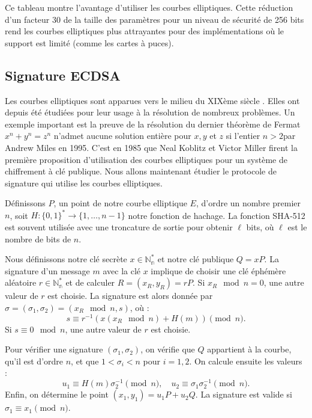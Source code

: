 \documentclass{backend}
\begin{document}
Ce tableau montre l'avantage d'utiliser les courbes elliptiques. Cette réduction d'un facteur 30 de la taille des paramètres pour un niveau de sécurité de 256 bits rend les courbes elliptiques plus attrayantes pour des implémentations où le support est limité (comme les cartes à puces).

\subsection{Signature ECDSA}

Les courbes elliptiques sont apparues vers le milieu du XIXème siècle \cite{guide_elliptic_crypto}. Elles ont depuis été étudiées pour leur usage à la résolution de nombreux problèmes. Un exemple important est la preuve de la résolution du dernier théorème de Fermat \og$x^n+ y^n = z^n$ n'admet aucune solution entière pour $x,y$ et $z$ si l'entier $n > 2$\fg par Andrew Miles en 1995. C'est en 1985 que Neal Koblitz et Victor Miller firent la première proposition d'utilisation des courbes elliptiques pour un système de chiffrement à clé publique. Nous allons maintenant étudier le protocole de signature qui utilise les courbes elliptiques. \medbreak

Définissons $P$, un point de notre courbe elliptique $E$, d'ordre un nombre premier $n$, soit $H : \{0, 1\}^* \to \{1, \dots, n - 1\}$ notre fonction de hachage. La fonction SHA-512 est souvent utilisée avec une troncature de sortie pour obtenir $\ell$ bits, où $\ell$ est le nombre de bits de $n$. \smallbreak

Nous définissons notre clé secrète $x \in \mathbb{N^*_n}$ et notre clé publique $Q = xP$. La signature d'un message $m$ avec la clé $x$ implique de choisir une clé éphémère aléatoire $r \in \mathbb{N^*_n}$ et de calculer $R = (x_R, y_R) = rP$. Si $x_R \mod n = 0$, une autre valeur de $r$ est choisie. La signature est alors donnée par $\sigma = (\sigma_1, \sigma_2) = (x_R \mod n, s)$, où :
\[
s \equiv r^{-1}(x(x_R \mod n) + H(m)) \pmod{n}.
\]
Si $s \equiv 0 \mod n$, une autre valeur de $r$ est choisie.

Pour vérifier une signature $(\sigma_1, \sigma_2)$, on vérifie que $Q$ appartient à la courbe, qu'il est d'ordre $n$, et que $1 < \sigma_i < n$ pour $i = 1,2$. On calcule ensuite les valeurs :
\[
u_1 \equiv H(m) \sigma_2^{-1} \pmod{n}, \quad u_2 \equiv \sigma_1 \sigma_2^{-1} \pmod{n}.
\]
Enfin, on détermine le point $(x_1, y_1) = u_1 P + u_2 Q$. La signature est valide si $\sigma_1 \equiv x_1 \pmod{n}$.
\end{document}
